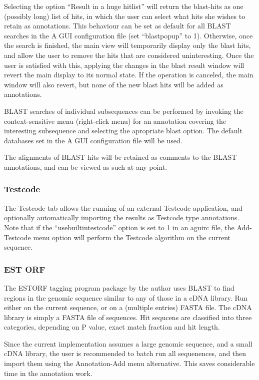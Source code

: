 Selecting the option ``Result in a huge hitlist'' will return the
blast-hits as one (possibly long) list of hits, in which the user can
select what hits she wishes to retain as annotations. This behaviour
can be set as default for all BLAST searches in the A GUI
configuration file (set ``blastpopup'' to 1). Otherwise, once the
search is finished, the main view will temporarily display only the
blast hits, and allow the user to remove the hits that are considered
uninteresting. Once the user is satisfied with this, applying the
changes in the blast result window will revert the main display to its
normal state. If the operation is canceled, the main window will also
revert, but none of the new blast hits will be added as annotations.

BLAST searches of individual subsequences can be performed by invoking
the context-sensitive menu (right-click menu) for an annotation
covering the interesting subsequence and selecting the apropriate
blast option. The default databases set in the A GUI configuration
file will be used.

The alignments of BLAST hits will be retained as comments to the BLAST
annotations, and can be viewed as such at any point.

\subsubsection{Testcode}

The Testcode tab allows the running of an external Testcode application, and
optionally automatically importing the results as Testcode type annotations.
Note that if the ``usebuiltintestcode'' option is set to 1 in an aguirc file, the
Add-Testcode menu option will perform the Testcode algorithm on the current sequence.

\subsubsection{EST ORF}

The ESTORF tagging program package by the author uses BLAST 
to find regions in the genomic sequence similar to any of those in a cDNA library.
Run either on the current sequence, or on a (multiple entries) FASTA file. The cDNA library is
simply a FASTA file of sequences. Hit sequcens are classified into three categories, depending on 
P value, exact match fraction and hit length.

Since the current implementation assumes a large genomic sequence, and
a small cDNA library, the user is recommended to batch run all
sequenences, and then import them using the Annotation-Add menu
alternative. This saves considerable time in the annotation work.

